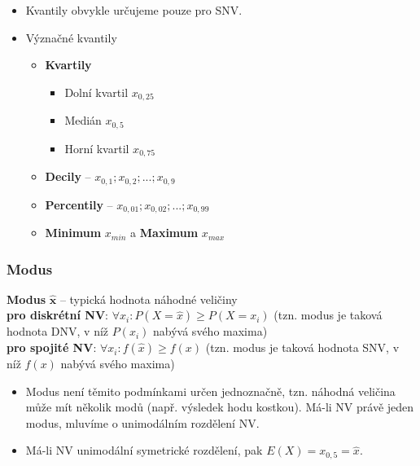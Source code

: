 \begin{itemize}
	\item Kvantily obvykle určujeme pouze pro SNV.
	\item Význačné kvantily
	\begin{itemize}
		\item \textbf{Kvartily}
		\begin{itemize}
			\item[] Dolní kvartil $x_{0,25}$
			\item[] Medián $x_{0,5}$
			\item[] Horní kvartil $x_{0,75}$
		\end{itemize}
		\item \textbf{Decily} -- $x_{0,1}; x_{0,2}; ... ;x_{0,9}$
		\item \textbf{Percentily} -- $x_{0,01}; x_{0,02}; ... ;x_{0,99}$
		\item \textbf{Minimum} $x_{min}$ a \textbf{Maximum} $x_{max}$
	\end{itemize}
\end{itemize}

\subsubsection{Modus}
\textbf{Modus} $\mathbf{\hat{x}}$ -- typická hodnota náhodné veličiny \\ 
\textbf{pro diskrétní NV}: $\forall x_i: P(X = \hat{x}) \geq P(X = x_i)$ (tzn. modus je taková hodnota DNV, v níž $P(x_i)$ nabývá svého maxima) \\
\textbf{pro spojité NV}: $\forall  x_i: f(\hat{x}) \geq f(x)$ (tzn. modus je taková hodnota SNV, v níž $f(x)$ nabývá svého maxima)
\begin{itemize}
	\item Modus není těmito podmínkami určen jednoznačně, tzn. náhodná veličina může mít několik modů (např. výsledek hodu kostkou). Má-li NV právě jeden modus, mluvíme o unimodálním rozdělení NV.
	\item Má-li NV unimodální symetrické rozdělení, pak $E(X) = x_{0,5} = \hat{x}$.
\end{itemize}


